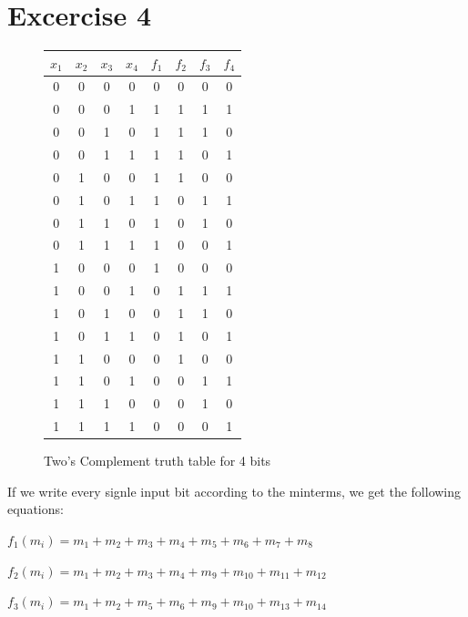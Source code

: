 
%

\section{\color{olive}Excercise 4}

\begin{figure}[h!] %
\begin{centering}
\begin{tabular}{|c|c|c|c|c|c|c|c|}
\hline
$x_{1}$  & $x_{2}$  & $x_{3}$  & $x_{4}$  & $f_{1}$  & $f_{2}$  & $f_{3}$  & $f_{4}$\tabularnewline
\hline
\hline
0  & 0  & 0  & 0  & 0  & 0  & 0  & 0\tabularnewline
\hline
0  & 0  & 0  & 1  & 1  & 1  & 1  & 1\tabularnewline
\hline
0  & 0  & 1  & 0  & 1  & 1  & 1  & 0\tabularnewline
\hline
0  & 0  & 1  & 1  & 1  & 1  & 0  & 1\tabularnewline
\hline
0  & 1  & 0  & 0  & 1  & 1  & 0  & 0\tabularnewline
\hline
0  & 1  & 0  & 1  & 1  & 0  & 1  & 1\tabularnewline
\hline
0  & 1  & 1  & 0  & 1  & 0  & 1  & 0\tabularnewline
\hline
0  & 1  & 1  & 1  & 1  & 0  & 0  & 1\tabularnewline
\hline
1  & 0  & 0  & 0  & 1  & 0  & 0  & 0\tabularnewline
\hline
1  & 0  & 0  & 1  & 0  & 1  & 1  & 1\tabularnewline
\hline
1  & 0  & 1  & 0  & 0  & 1  & 1  & 0\tabularnewline
\hline
1  & 0  & 1  & 1  & 0  & 1  & 0  & 1\tabularnewline
\hline
1  & 1  & 0  & 0  & 0  & 1  & 0  & 0\tabularnewline
\hline
1  & 1  & 0  & 1  & 0  & 0  & 1  & 1\tabularnewline
\hline
1  & 1  & 1  & 0  & 0  & 0  & 1  & 0\tabularnewline
\hline
1  & 1  & 1  & 1  & 0  & 0  & 0  & 1\tabularnewline
\hline
\end{tabular}
\par\end{centering}
\caption{\color{cyan}Two's Complement truth table for 4 bits}
\end{figure}

If we write every signle input bit according to the minterms, we get the following equations:
\begin{center}
$f_{1}(m_{i})=m_{1}+m_{2}+m_{3}+m_{4}+m_{5}+m_{6}+m_{7}+m_{8}$
\par\end{center}

\begin{center}
$f_{2}(m_{i})=m_{1}+m_{2}+m_{3}+m_{4}+m_{9}+m_{10}+m_{11}+m_{12}$
\par\end{center}

\begin{center}
$f_{3}(m_{i})=m_{1}+m_{2}+m_{5}+m_{6}+m_{9}+m_{10}+m_{13}+m_{14}$
\par\end{center}

